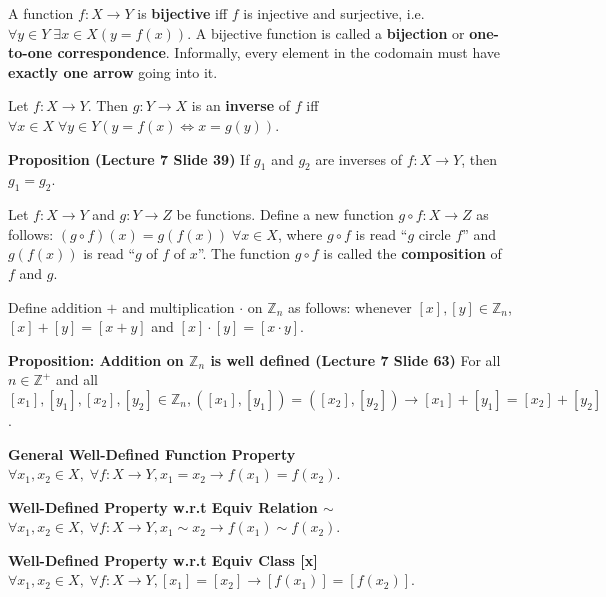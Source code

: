 \documentclass{article}
\begin{document}
\begin{description}
    \item[Bijection (one-to-one correspondence)] A function $f:X\to Y$ is \textbf{bijective} iff $f$ is injective and surjective, i.e. $\forall y\in Y\;\exists x\in X(y=f(x))$. A bijective function is called a \textbf{bijection} or \textbf{one-to-one correspondence}. Informally, every element in the codomain must have \textbf{exactly one arrow} going into it. 
    \item[Inverse Function] Let $f:X\to Y$. Then $g:Y\to X$ is an \textbf{inverse} of $f$ iff $\forall x\in X\;\forall y\in Y(y=f(x)\Leftrightarrow x=g(y))$.
    \item \qquad \textbf{Proposition (Lecture 7 Slide 39)} If $g_{1}$ and $g_{2}$ are inverses of $f:X\to Y$, then $g_{1}=g_{2}$.
    \item[Composition of Functions] Let $f:X\to Y$ and $g:Y\to Z$ be functions. Define a new function $g\circ f:X\to Z$ as follows: $(g\circ f)(x)=g(f(x))\;\forall x\in X$, where $g\circ f$ is read ``$g$ circle $f$'' and $g(f(x))$ is read ``$g$ of $f$ of $x$''. The function $g\circ f$ is called the \textbf{composition} of $f$ and $g$.
    \item[Addition and Multiplication on $\mathbb{Z}_{n}$]Define addition $+$ and multiplication $\cdot$ on $\mathbb{Z}_{n}$ as follows: whenever $[x],[y]\in\mathbb{Z}_{n}$, $[x]+[y]=[x+y]$ and $[x]\cdot[y]=[x\cdot y]$.
    \item \qquad \textbf{Proposition: Addition on $\mathbb{Z}_{n}$ is well defined (Lecture 7 Slide 63)} For all $n\in\mathbb{Z}^{+}$ and all $[x_{1}],[y_{1}],[x_{2}],[y_{2}]\in\mathbb{Z}_{n}, ([x_{1}],[y_{1}])=([x_{2}],[y_{2}])\to [x_{1}]+[y_{1}]=[x_{2}]+[y_{2}]$.
    \item \qquad \textbf{General Well-Defined Function Property}\quad\;\; $\forall x_{1},x_{2}\in X,\; \forall f:X\to Y,x_{1}=x_{2}\to f(x_{1})=f(x_{2})$.
    \item \qquad \textbf{Well-Defined Property w.r.t Equiv Relation ${\sim}$}\quad \;\;$\forall x_{1},x_{2}\in X,\; \forall f:X\to Y,x_{1}{\sim}x_{2}\to f(x_{1}){\sim}f(x_{2})$.
    \item \qquad \textbf{Well-Defined Property w.r.t Equiv Class [x]}\quad \;\;$\forall x_{1},x_{2}\in X,\; \forall f:X\to Y,[x_{1}]=[x_{2}]\to [f(x_{1})]=[f(x_{2})]$.
    

\end{description}
\end{document}

